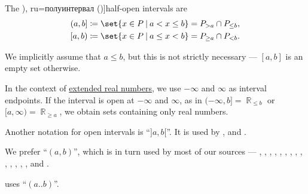 \begin{definition}
\begin{thmenum}
     The \term[bg=полузатворен интервал (\cite[39]{Тагамлицки1971ДиференциалноСмятане}), ru=полуинтервал (\cite[82]{АлександровМаркушевичХинчинИПр1951ЭнциклопедияТом1})]{half-open intervals} are
    \begin{equation*}
      \begin{aligned}
        (a, b] \coloneqq \set{ x \in P \given a < x \leq b } = P_{> a} \cap P_{\leq b},
        \\
        [a, b) \coloneqq \set{ x \in P \given a \leq x < b } = P_{\geq a} \cap P_{< b}.
      \end{aligned}
    \end{equation*}
  \end{thmenum}
\end{definition}
\begin{comments}
  \item We implicitly assume that \( a \leq b \), but this is not strictly necessary --- \( [a, b] \) is an empty set otherwise.

  \item In the context of \hyperref[def:extended_real_numbers]{extended real numbers}, we use \( -\infty \) and \( \infty \) as interval endpoints. If the interval is open at \( -\infty \) and \( \infty \), as in \( (-\infty, b] = \BbbR_{\leq b} \) or \( [a, \infty) = \BbbR_{\geq a} \), we obtain sets containing only real numbers.

  \item Another notation for open intervals is \enquote{\( ]a, b[ \)}. It is used by
  ,
   and
  .

  We prefer \enquote{\( (a, b) \)}, which is in turn used by most of our sources ---
  ,
  ,
  ,
  ,
  ,
  ,
  ,
  ,
  ,
  ,
  ,
  ,
  ,
  ,
   and
  .

   uses \enquote{\( (a..b) \)}.
\end{comments}

